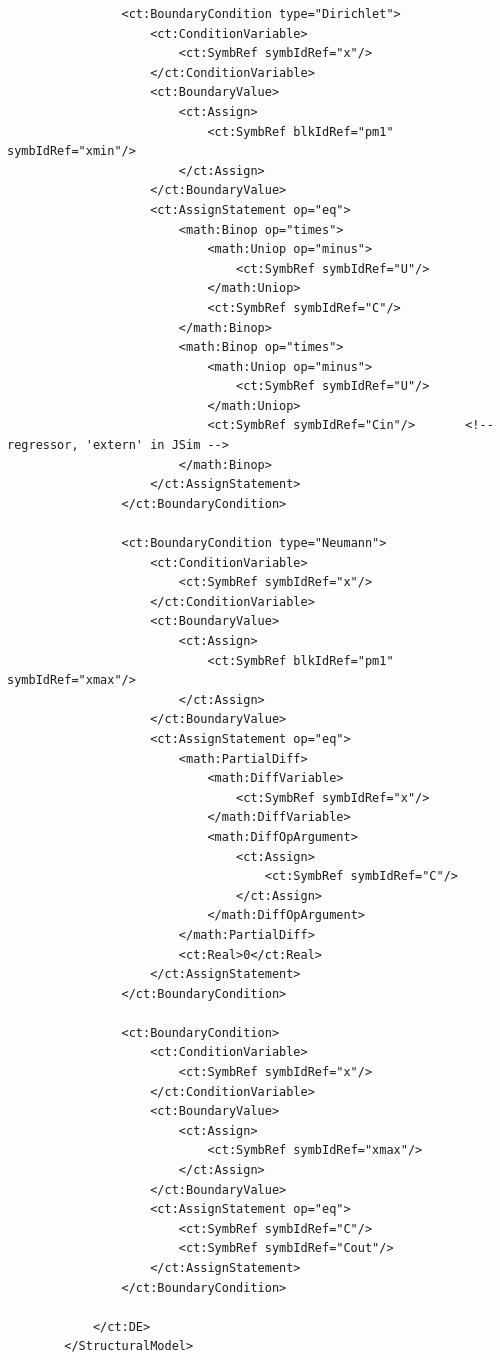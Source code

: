 \lstset{language=XML}
\begin{lstlisting}
                <ct:BoundaryCondition type="Dirichlet">
                    <ct:ConditionVariable>
                        <ct:SymbRef symbIdRef="x"/>
                    </ct:ConditionVariable>
                    <ct:BoundaryValue>
                        <ct:Assign>
                            <ct:SymbRef blkIdRef="pm1" symbIdRef="xmin"/>
                        </ct:Assign>
                    </ct:BoundaryValue>
                    <ct:AssignStatement op="eq">
                        <math:Binop op="times">
                            <math:Uniop op="minus">
                                <ct:SymbRef symbIdRef="U"/>
                            </math:Uniop>
                            <ct:SymbRef symbIdRef="C"/>
                        </math:Binop>
                        <math:Binop op="times">
                            <math:Uniop op="minus">
                                <ct:SymbRef symbIdRef="U"/>
                            </math:Uniop>
                            <ct:SymbRef symbIdRef="Cin"/>       <!-- regressor, 'extern' in JSim -->
                        </math:Binop>
                    </ct:AssignStatement>
                </ct:BoundaryCondition>
                
                <ct:BoundaryCondition type="Neumann">
                    <ct:ConditionVariable>
                        <ct:SymbRef symbIdRef="x"/>
                    </ct:ConditionVariable>
                    <ct:BoundaryValue>
                        <ct:Assign>
                            <ct:SymbRef blkIdRef="pm1" symbIdRef="xmax"/>
                        </ct:Assign>
                    </ct:BoundaryValue>
                    <ct:AssignStatement op="eq">
                        <math:PartialDiff>
                            <math:DiffVariable>
                                <ct:SymbRef symbIdRef="x"/>
                            </math:DiffVariable>
                            <math:DiffOpArgument>
                                <ct:Assign>
                                    <ct:SymbRef symbIdRef="C"/>
                                </ct:Assign>
                            </math:DiffOpArgument>
                        </math:PartialDiff>
                        <ct:Real>0</ct:Real>
                    </ct:AssignStatement>
                </ct:BoundaryCondition>
                
                <ct:BoundaryCondition>
                    <ct:ConditionVariable>
                        <ct:SymbRef symbIdRef="x"/>
                    </ct:ConditionVariable>
                    <ct:BoundaryValue>
                        <ct:Assign>
                            <ct:SymbRef symbIdRef="xmax"/>
                        </ct:Assign>
                    </ct:BoundaryValue>
                    <ct:AssignStatement op="eq">
                        <ct:SymbRef symbIdRef="C"/>
                        <ct:SymbRef symbIdRef="Cout"/>
                    </ct:AssignStatement>
                </ct:BoundaryCondition>
                
            </ct:DE>
        </StructuralModel>
\end{lstlisting}


